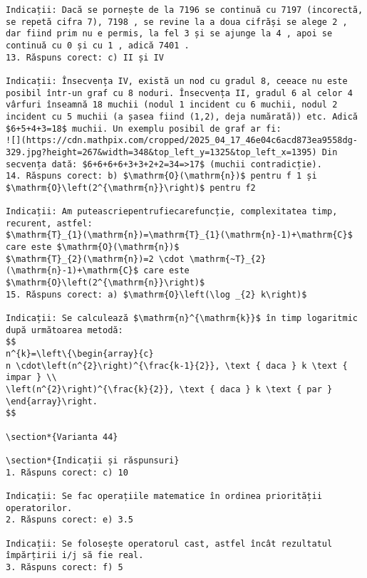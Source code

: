 \begin{verbatim}
Indicații: Dacă se pornește de la 7196 se continuă cu 7197 (incorectă, se repetă cifra 7), 7198 , se revine la a doua cifrăși se alege 2 , dar fiind prim nu e permis, la fel 3 și se ajunge la 4 , apoi se continuă cu 0 și cu 1 , adică 7401 .
13. Răspuns corect: c) II și IV

Indicații: Însecvența IV, există un nod cu gradul 8, ceeace nu este posibil într-un graf cu 8 noduri. Însecvența II, gradul 6 al celor 4 vârfuri înseamnă 18 muchii (nodul 1 incident cu 6 muchii, nodul 2 incident cu 5 muchii (a șasea fiind (1,2), deja numărată)) etc. Adică
$6+5+4+3=18$ muchii. Un exemplu posibil de graf ar fi:
![](https://cdn.mathpix.com/cropped/2025_04_17_46e04c6acd873ea9558dg-329.jpg?height=267&width=348&top_left_y=1325&top_left_x=1395) Din secvența dată: $6+6+6+6+3+3+2+2=34=>17$ (muchii contradicție).
14. Răspuns corect: b) $\mathrm{O}(\mathrm{n})$ pentru f 1 și $\mathrm{O}\left(2^{\mathrm{n}}\right)$ pentru f2

Indicații: Am puteascriepentrufiecarefuncție, complexitatea timp, recurent, astfel:
$\mathrm{T}_{1}(\mathrm{n})=\mathrm{T}_{1}(\mathrm{n}-1)+\mathrm{C}$ care este $\mathrm{O}(\mathrm{n})$
$\mathrm{T}_{2}(\mathrm{n})=2 \cdot \mathrm{~T}_{2}(\mathrm{n}-1)+\mathrm{C}$ care este $\mathrm{O}\left(2^{\mathrm{n}}\right)$
15. Răspuns corect: a) $\mathrm{O}\left(\log _{2} k\right)$

Indicații: Se calculează $\mathrm{n}^{\mathrm{k}}$ în timp logaritmic după următoarea metodă:
$$
n^{k}=\left\{\begin{array}{c}
n \cdot\left(n^{2}\right)^{\frac{k-1}{2}}, \text { daca } k \text { impar } \\
\left(n^{2}\right)^{\frac{k}{2}}, \text { daca } k \text { par }
\end{array}\right.
$$

\section*{Varianta 44}

\section*{Indicații și răspunsuri}
1. Răspuns corect: c) 10

Indicații: Se fac operațiile matematice în ordinea priorității operatorilor.
2. Răspuns corect: e) 3.5

Indicații: Se folosește operatorul cast, astfel încât rezultatul împărțirii i/j să fie real.
3. Răspuns corect: f) 5


\end{verbatim}
